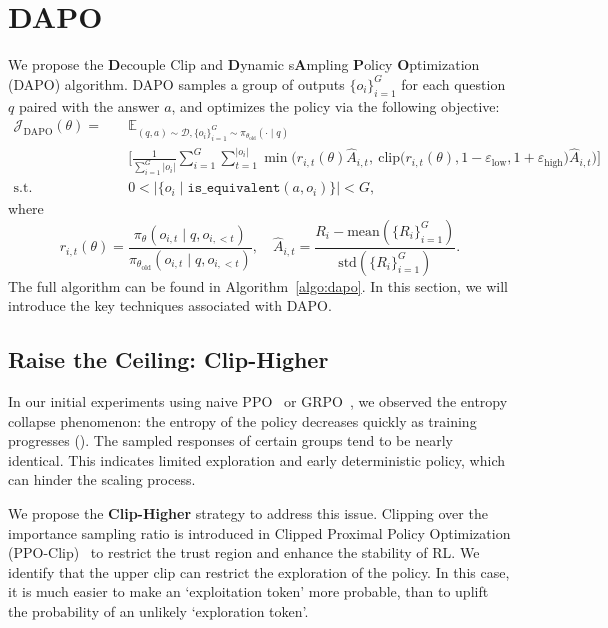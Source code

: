 \section{DAPO}
\label{sec:method}

We propose the \textbf{D}ecouple Clip and \textbf{D}ynamic s\textbf{A}mpling \textbf{P}olicy \textbf{O}ptimization (DAPO) algorithm. DAPO samples a group of outputs $\{o_i\}_{i=1}^G$ for each question $q$ paired with the answer $a$, and optimizes the policy via the following objective:
\begin{equation}
\begin{aligned}
\mathcal{J}_{\text{DAPO}}(\theta) =\quad& \mathbb{E}_{(q,a)\sim \mathcal{D}, \{o_i\}_{i=1}^G\sim \pi_{\theta_\text{old}}(\cdot\mid q)}\\&
\Bigg[\frac{1}{\sum_{i=1}^{G}|o_i|}\sum_{i=1}^{G}\sum_{t=1}^{|o_i|} 
\min \Big( r_{i,t}(\theta) \hat{A}_{i,t},  
\ \text{clip} \Big( r_{i,t}(\theta), 1 - {\varepsilon_{\text{low}}}, 1 + {\varepsilon_{\text{high}}} \Big) \hat{A}_{i,t} \Big) \Bigg]
\\
\text{s.t.}\quad& 0< \Big|\{o_i\mid\texttt{is\_equivalent}(a,o_i)\}\Big|< G,
\label{eq:dapoloss}
\end{aligned}
\end{equation}
where
\begin{equation}
    r_{i,t}(\theta)=\frac{\pi_{\theta}(o_{i,t} \mid q, o_{i,<t})}{\pi_{\theta_{\text{old}}}(o_{i,t} \mid q,o_{i,<t})},\quad\hat{A}_{i,t} = \frac{R_i - \text{mean}(\{R_i\}_{i=1}^G)}{\text{std}(\{R_i\}_{i=1}^G)}.
\label{eq:advantage_calculation}
\end{equation}
The full algorithm can be found in Algorithm~\ref{algo:dapo}. In this section, we will introduce the key techniques associated with DAPO.

\subsection{Raise the Ceiling: Clip-Higher}
\label{sec:cliphigher}

In our initial experiments using naive PPO~\cite{schulman2017proximal} or GRPO~\cite{deepseekmath}, we observed the entropy collapse phenomenon: the entropy of the policy decreases quickly as training progresses (). The sampled responses of certain groups tend to be nearly identical. This indicates limited exploration and early deterministic policy, which can hinder the scaling process. 

We propose the \textbf{Clip-Higher} strategy to address this issue. Clipping over the importance sampling ratio is introduced in Clipped Proximal Policy Optimization (PPO-Clip)~\cite{schulman2017proximal} to restrict the trust region and enhance the stability of RL. 
We identify that the upper clip can restrict the exploration of the policy. In this case, it is much easier to make an `exploitation token' more probable, than to uplift the probability of an unlikely `exploration token'.

